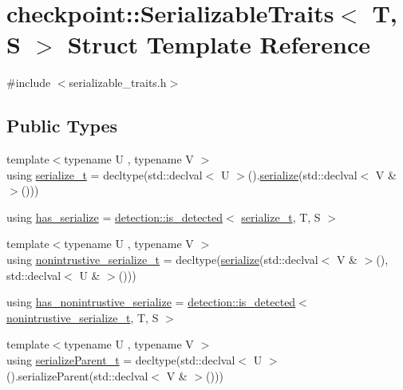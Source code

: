 \hypertarget{structcheckpoint_1_1_serializable_traits}{}\section{checkpoint\+:\+:Serializable\+Traits$<$ T, S $>$ Struct Template Reference}
\label{structcheckpoint_1_1_serializable_traits}


{\ttfamily \#include $<$serializable\+\_\+traits.\+h$>$}

\subsection*{Public Types}
\begin{DoxyCompactItemize}
\item 
{\footnotesize template$<$typename U , typename V $>$ }\\using \hyperlink{structcheckpoint_1_1_serializable_traits_a416ff19cd1038279ace5cb49e3a9fb7d}{serialize\+\_\+t} = decltype(std\+::declval$<$ U $>$().\hyperlink{namespacecheckpoint_a075da4e7344cf037943362517e606c3a}{serialize}(std\+::declval$<$ V \& $>$()))
\item 
using \hyperlink{structcheckpoint_1_1_serializable_traits_ab565b1e56509babb16ea5525ed4a3ebf}{has\+\_\+serialize} = \hyperlink{namespacedetection_a30893549a3de1e9603d78dad6d5dce92}{detection\+::is\+\_\+detected}$<$ \hyperlink{structcheckpoint_1_1_serializable_traits_a416ff19cd1038279ace5cb49e3a9fb7d}{serialize\+\_\+t}, T, S $>$
\item 
{\footnotesize template$<$typename U , typename V $>$ }\\using \hyperlink{structcheckpoint_1_1_serializable_traits_a3284d2cfd29cfe429d5cf76186d3fe3c}{nonintrustive\+\_\+serialize\+\_\+t} = decltype(\hyperlink{namespacecheckpoint_a075da4e7344cf037943362517e606c3a}{serialize}(std\+::declval$<$ V \& $>$(), std\+::declval$<$ U \& $>$()))
\item 
using \hyperlink{structcheckpoint_1_1_serializable_traits_abc3628bc485acd98b08840fb99450850}{has\+\_\+nonintrustive\+\_\+serialize} = \hyperlink{namespacedetection_a30893549a3de1e9603d78dad6d5dce92}{detection\+::is\+\_\+detected}$<$ \hyperlink{structcheckpoint_1_1_serializable_traits_a3284d2cfd29cfe429d5cf76186d3fe3c}{nonintrustive\+\_\+serialize\+\_\+t}, T, S $>$
\item 
{\footnotesize template$<$typename U , typename V $>$ }\\using \hyperlink{structcheckpoint_1_1_serializable_traits_a38585e5b9aa0653c08ff48504e922ad5}{serialize\+Parent\+\_\+t} = decltype(std\+::declval$<$ U $>$().serialize\+Parent(std\+::declval$<$ V \& $>$()))

\end{DoxyCompactItemize}
